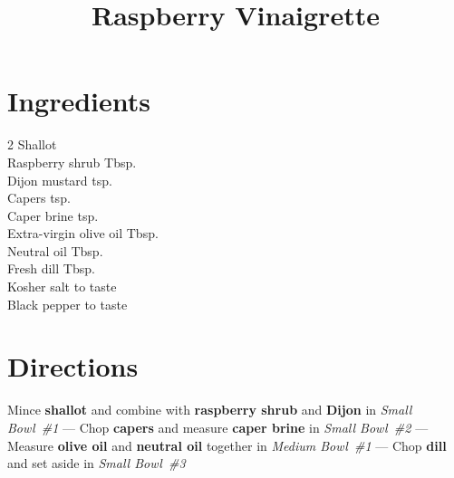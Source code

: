 \documentclass[11pt,letterpaper]{article}
\title{Raspberry Vinaigrette}
\author{}
\date{}
\begin{document}
\maketitle
\thispagestyle{empty}

\section*{Ingredients}

\setlength{\columnsep}{20pt}
\begin{multicols}{2}
\noindent
    Shallot  \\
    Raspberry shrub  Tbsp. \\
    Dijon mustard  tsp. \\
    Capers  tsp. \\
    \columnbreak
    Caper brine  tsp. \\
    Extra-virgin olive oil  Tbsp. \\
    Neutral oil  Tbsp. \\
    Fresh dill  Tbsp. \\
    Kosher salt \dotfill to taste \\
    Black pepper \dotfill to taste
\end{multicols}

\section*{Directions}

\noindent
Mince \textbf{shallot} and combine with \textbf{raspberry shrub} and \textbf{Dijon} in \textit{Small Bowl~\#1} --- Chop \textbf{capers} and measure \textbf{caper brine} in \textit{Small Bowl~\#2} --- Measure \textbf{olive oil} and \textbf{neutral oil} together in \textit{Medium Bowl~\#1} --- Chop \textbf{dill} and set aside in \textit{Small Bowl~\#3}
\end{document}
